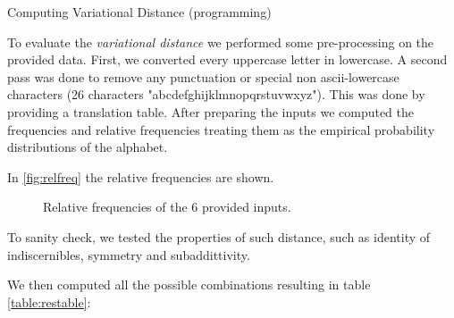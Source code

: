 \documentclass[a4paper,10pt]{article}
\begin{document}
\begin{nproblem}{8}{Computing Variational Distance (programming)}
\begin{solution}
To evaluate the \textit{variational distance} we performed some pre-processing
on the provided data.
First, we converted every uppercase letter in lowercase.
A second pass was done to remove any punctuation or special non ascii-lowercase
characters (26 characters "abcdefghijklmnopqrstuvwxyz"). This was 
done by providing a translation table. After preparing the inputs we computed
the frequencies and relative frequencies treating them as the empirical probability
distributions of the alphabet.

In \autoref{fig:relfreq} the relative frequencies are shown.

\noindent
\begin{figure}[H]
    \centering
    \caption{Relative frequencies of the 6 provided inputs.}
    \label{fig:relfreq}
\end{figure}

To sanity check, we tested the properties of such distance, such as identity of indiscernibles, 
symmetry and subaddittivity.

We then computed all the possible combinations resulting in table \autoref{table:restable}:



\end{solution}
\end{nproblem}
\end{document}
